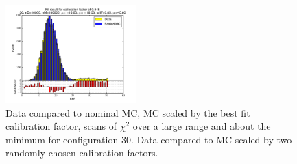 \begin{figure}[htbp]
\begin{center}
\includegraphics[width=0.45\textwidth]{../FIGURES/30/FIG_Fit_result_for_calibration_factor_of_0_945.pdf} 
\caption{Data compared to nominal MC, MC scaled by the best fit calibration factor, scans of $\chi^2$ over a large range and about the minimum for configuration 30. Data compared to MC scaled by two randomly chosen calibration factors.} 
\label{tab:best_30} 
\end{center} \end{figure} 

